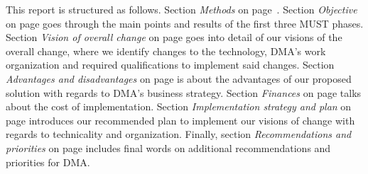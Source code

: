 This report is structured as follows. Section \textit{Methods} on page~\pageref{sec:method}. Section \textit{Objective} on page \pageref{sec:objective} goes through the main points and results of the first three MUST phases. Section \textit{Vision of overall change} on page \pageref{sec:vision} goes into detail of our visions of the overall change, where we identify changes to the technology, DMA’s work organization and required qualifications to implement said changes. Section \textit{Advantages and disadvantages} on page \pageref{sec:advantages} is about the advantages of our proposed solution with regards to DMA’s business strategy. Section \textit{Finances} on page \pageref{sec:finances} talks about the cost of implementation. Section \textit{Implementation strategy and plan} on page \pageref{sec:implementation} introduces our recommended plan to implement our visions of change with regards to technicality and organization. Finally, section \textit{Recommendations and priorities} on page \pageref{sec:recommendations} includes final words on additional recommendations and priorities for DMA.

